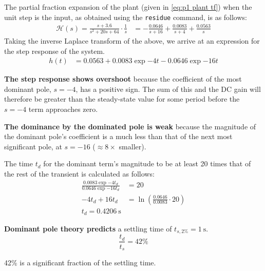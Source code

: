 \problem

The partial fraction expansion of the plant (given in \cref{eq:p1 plant tf}) when the unit step is the input, as obtained using the \texttt{residue} command, is as follows:
\begin{align*}
	\mathcal{H}(s) = \frac{s+3.6}{s^2+20s+64}\cdot\frac{1}{s} &= -\frac{0.0646}{s+16} + \frac{0.0083}{s+4} + \frac{0.0563}{s}
\end{align*}
Taking the inverse Laplace transform of the above, we arrive at an expression for the step response of the system.
\begin{align*}
	h(t) &= 0.0563 + 0.0083\exp{-4t} -0.0646\exp{-16t}
\end{align*}

\textbf{The step response shows overshoot} because the coefficient of the most dominant pole, $s=-4$, has a positive sign. The sum of this and the DC gain will therefore be greater than the steady-state value for some period before the $s=-4$ term approaches zero.


\textbf{The dominance by the dominated pole is weak} because the magnitude of the dominant pole's coefficient is a much less than that of the next most significant pole, at $s=-16$ ($\approx8\times$ smaller).


The time $t_{d}$ for the dominant term's magnitude to be at least 20 times that of the rest of the transient is calculated as follows:
\begin{align*}
	\frac{0.0083\exp{-4t_d}}{0.0646\exp{-16t_d}} &= 20\\
	-4t_d + 16 t_d&= \ln{\left(\frac{0.0646}{0.0083}\cdot 20\right)}\\
	t_d = \SI{0.4206}{\second}
\end{align*}


\textbf{Dominant pole theory predicts} a settling time of $t_{s,2\%}=\SI{1}{\second}$. 
$$
\frac{t_d}{t_{s}} = 42\%
$$

42\% is a significant fraction of the settling time.  